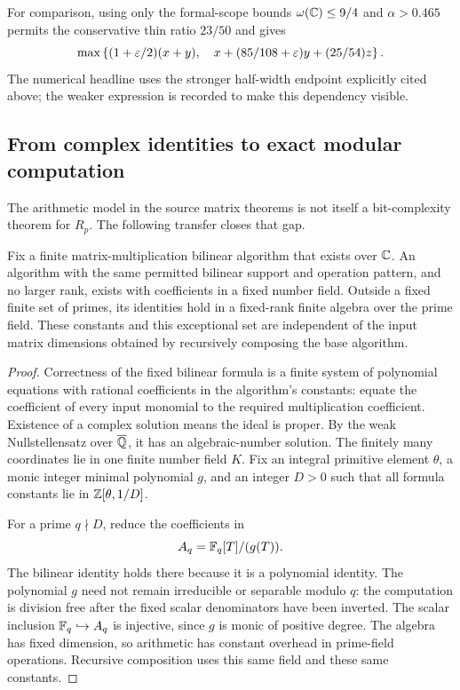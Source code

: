 For comparison, using only the formal-scope bounds $\omega(\mathbb C)\le9/4$
and $\alpha>0.465$ permits the conservative thin ratio $23/50$ and gives
\[
 \max\left\{(1+\varepsilon/2)(x+y),\quad
 x+(85/108+\varepsilon)y+(25/54)z\right\}.
\]
The numerical headline uses the stronger half-width endpoint explicitly
cited above; the weaker expression is recorded to make this dependency
visible.

\subsection{From complex identities to exact modular computation}

The arithmetic model in the source matrix theorems is not itself a
bit-complexity theorem for $R_p$. The following transfer closes that gap.

\begin{lemma}\label{lem:descent}
Fix a finite matrix-multiplication bilinear algorithm that exists over
$\mathbb C$. An algorithm with the same permitted bilinear support and operation
pattern, and no larger rank, exists with coefficients in a fixed number
field. Outside a fixed finite
set of primes, its identities hold in a fixed-rank finite algebra over the
prime field. These constants and this exceptional set are independent of
the input matrix dimensions obtained by recursively composing the base
algorithm.
\end{lemma}

\begin{proof}
Correctness of the fixed bilinear formula is a finite system of polynomial
equations with rational coefficients in the algorithm's constants: equate
the coefficient of every input monomial to the required multiplication
coefficient. Existence of a complex solution means the ideal is proper.
By the weak Nullstellensatz over $\overline{\mathbb Q}$, it has an algebraic-number
solution. The finitely many coordinates lie in one finite number field
$K$. Fix an integral primitive element $\theta$, a monic integer minimal
polynomial $g$, and an integer $D>0$ such that all formula constants lie
in $\mathbb Z[\theta,1/D]$.

For a prime $q\nmid D$, reduce the coefficients in
\[
 A_q=\mathbb F_q[T]/(g(T)).
\]
The bilinear identity holds there because it is a polynomial identity.
The polynomial $g$ need not remain irreducible or separable modulo $q$:
the computation is division free after the fixed scalar denominators
have been inverted. The scalar inclusion $\mathbb F_q\hookrightarrow A_q$ is
injective, since $g$ is monic of positive degree. The algebra has fixed
dimension, so arithmetic has constant overhead in prime-field operations.
Recursive composition uses this same field and these same constants.
\end{proof}

